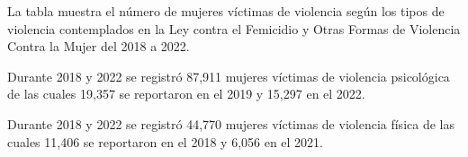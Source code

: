 La tabla muestra el número de mujeres víctimas de violencia según los tipos de violencia contemplados en la Ley contra el Femicidio y Otras Formas de Violencia Contra la Mujer del 2018 a 2022. 

Durante 2018 y 2022 se registró 87,911 mujeres víctimas de violencia psicológica de las cuales 19,357 se reportaron en el 2019 y 15,297 en el 2022. 

Durante 2018 y 2022 se registró 44,770 mujeres víctimas de violencia física de las cuales 11,406 se reportaron en el 2018 y 6,056 en el 2021. 
